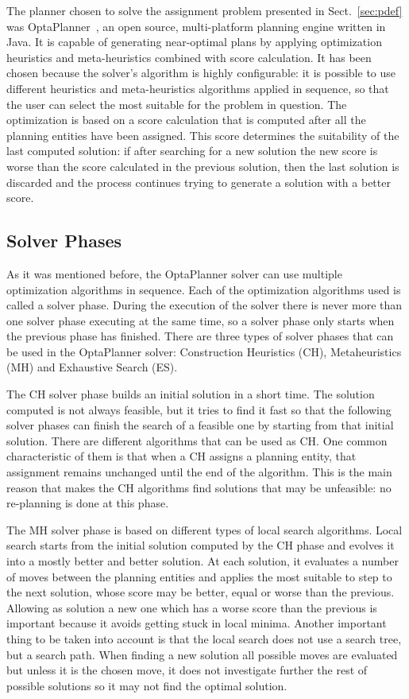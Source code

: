 \documentclass[letterpaper, 10 pt, conference]{ieeeconf}  %
\begin{document}
The planner chosen to solve the assignment problem presented in Sect.~\ref{sec:pdef} was OptaPlanner~\cite{optaplanner}, an open source, multi-platform planning engine written in Java. It is capable of generating near-optimal plans by applying optimization heuristics and meta-heuristics combined with score calculation. It has been chosen because the solver's algorithm is highly configurable: it is possible to use different heuristics and meta-heuristics algorithms applied in sequence, so that the user can select the most suitable for the problem in question. The optimization is based on a score calculation that is computed after all the planning entities have been assigned. This score determines the suitability of the last computed solution: if after searching for a new solution the new score is worse than the score calculated in the previous solution, then the last solution is discarded and the process continues trying to generate a solution with a better score.

\subsection{Solver Phases}
\label{sec:solver_phases}

As it was mentioned before, the OptaPlanner solver can use multiple optimization algorithms in sequence. Each of the optimization algorithms used is called a solver phase. During the execution of the solver there is never more than one solver phase executing at the same time, so a solver phase only starts when the previous phase has finished. There are three types of solver phases that can be used in the OptaPlanner solver: Construction Heuristics (CH), Metaheuristics (MH) and Exhaustive Search (ES). 

The CH solver phase builds an initial solution in a short time. The solution computed is not always feasible, but it tries to find it fast so that the following solver phases can finish the search of a feasible one by starting from that initial solution. There are different algorithms that can be used as CH. One common characteristic of them is that when a CH assigns a planning entity, that assignment remains unchanged until the end of the algorithm. This is the main reason that makes the CH algorithms find solutions that may be unfeasible: no re-planning is done at this phase.

The MH solver phase is based on different types of local search algorithms. Local search starts from the initial solution computed by the CH phase and evolves it into a mostly better and better solution. At each solution, it evaluates a number of moves between the planning entities and applies the most suitable to step to the next solution, whose score may be better, equal or worse than the previous. Allowing as solution a new one which has a worse score than the previous is important because it avoids getting stuck in local minima. Another important thing to be taken into account is that the local search does not use a search tree, but a search path. When finding a new solution all possible moves are evaluated but unless it is the chosen move, it does not investigate further the rest of possible solutions so it may not find the optimal solution. 
\end{document}
